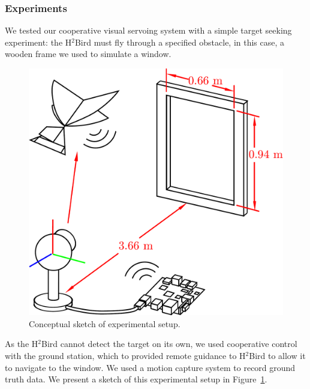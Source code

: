 \documentclass{aamas2013}
\begin{document}
\subsubsection{Experiments}
\label{sec:experiments_verification}

We tested our cooperative visual servoing system with a simple target seeking
experiment: the H$^2$Bird must fly through a specified obstacle, in this 
case, a wooden frame we used to simulate a window.

\begin{figure}[tb]
\centering
\includegraphics[width=\linewidth]{figures/experiment_cartoon.pdf}
\caption{Conceptual sketch of experimental setup.}
\label{fig:experiment_cartoon}
\end{figure}

As the H$^2$Bird cannot detect the target on its own, we used cooperative 
control with the ground station, which to provided remote guidance to 
H$^2$Bird to allow it to navigate to the window. We used a motion capture 
system to record ground truth data. We present a sketch of this experimental 
setup in Figure~\ref{fig:experiment_cartoon}.
\end{document}
